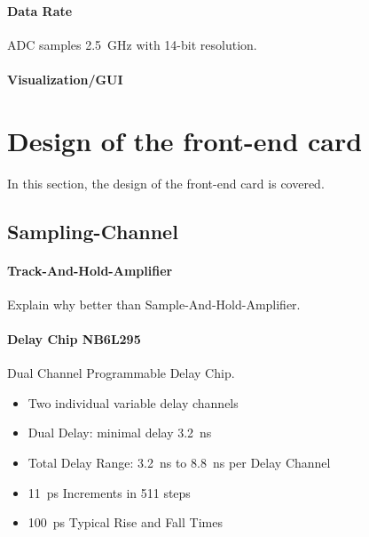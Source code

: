 \paragraph{Data Rate}

ADC samples \@ \SI{2.5}{\giga \hertz} with 14-bit resolution.

\paragraph{Visualization/GUI}
\newpage
\section{Design of the front-end card}
In this section, the design of the front-end card is covered.

\subsection{Sampling-Channel}
\paragraph{Track-And-Hold-Amplifier}
Explain why better than Sample-And-Hold-Amplifier.
\paragraph{Delay Chip NB6L295}
Dual Channel Programmable Delay Chip.

\begin{itemize}[noitemsep]
	\item Two individual variable delay channels
	\item Dual Delay: minimal delay \SI{3.2}{\nano \second}
	\item Total Delay Range: \SI{3.2}{\nano \second} to \SI{8.8}{\nano \second} per Delay Channel
	\item \SI{11}{\pico \second} Increments in 511 steps
	\item \SI{100}{\pico \second} Typical Rise and Fall Times
\end{itemize}

